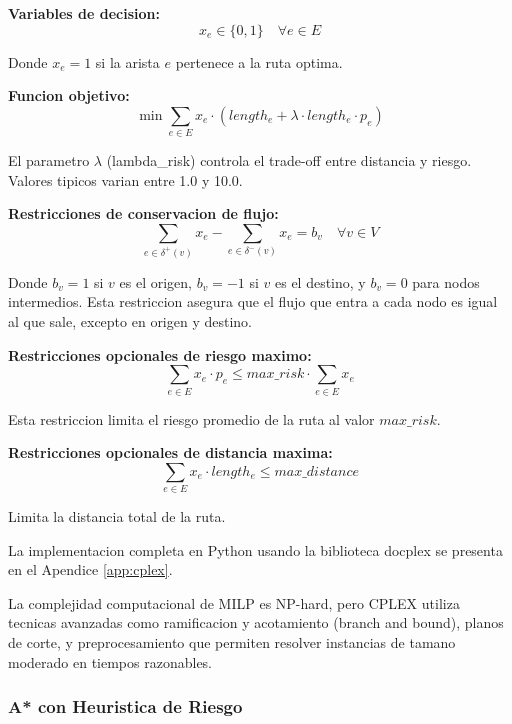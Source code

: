 \documentclass[conference]{IEEEtran}
\begin{document}
\textbf{Variables de decision:}
\begin{equation}
x_e \in \{0, 1\} \quad \forall e \in E
\end{equation}

Donde $x_e = 1$ si la arista $e$ pertenece a la ruta optima.

\textbf{Funcion objetivo:}
\begin{equation}
\min \sum_{e \in E} x_e \cdot \left( length_e + \lambda \cdot length_e \cdot p_e \right)
\end{equation}

El parametro $\lambda$ (lambda\_risk) controla el trade-off entre distancia y riesgo. Valores tipicos varian entre 1.0 y 10.0.

\textbf{Restricciones de conservacion de flujo:}
\begin{equation}
\sum_{e \in \delta^+(v)} x_e - \sum_{e \in \delta^-(v)} x_e = b_v \quad \forall v \in V
\end{equation}

Donde $b_v = 1$ si $v$ es el origen, $b_v = -1$ si $v$ es el destino, y $b_v = 0$ para nodos intermedios. Esta restriccion asegura que el flujo que entra a cada nodo es igual al que sale, excepto en origen y destino.

\textbf{Restricciones opcionales de riesgo maximo:}
\begin{equation}
\sum_{e \in E} x_e \cdot p_e \leq max\_risk \cdot \sum_{e \in E} x_e
\end{equation}

Esta restriccion limita el riesgo promedio de la ruta al valor $max\_risk$.

\textbf{Restricciones opcionales de distancia maxima:}
\begin{equation}
\sum_{e \in E} x_e \cdot length_e \leq max\_distance
\end{equation}

Limita la distancia total de la ruta.

La implementacion completa en Python usando la biblioteca docplex se presenta en el Apendice \ref{app:cplex}.

La complejidad computacional de MILP es NP-hard, pero CPLEX utiliza tecnicas avanzadas como ramificacion y acotamiento (branch and bound), planos de corte, y preprocesamiento que permiten resolver instancias de tamano moderado en tiempos razonables.

\subsubsection{A* con Heuristica de Riesgo}
\end{document}
